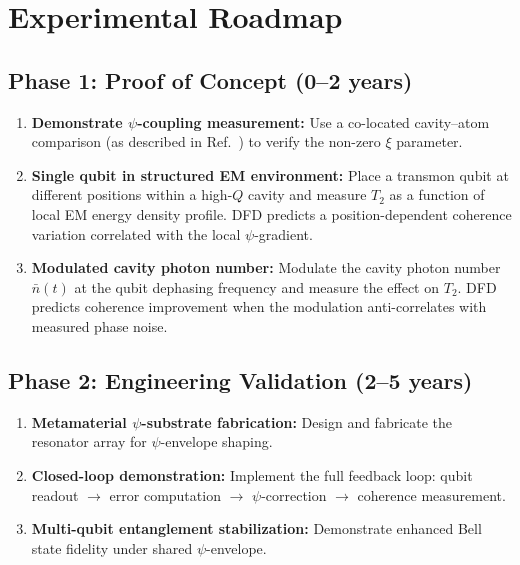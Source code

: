 \documentclass[aps,prd,twocolumn,superscriptaddress,nofootinbib]{revtex4-2}
\begin{document}
\section{Experimental Roadmap}\label{sec:roadmap}

\subsection{Phase 1: Proof of Concept (0--2 years)}

\begin{enumerate}
\item \textbf{Demonstrate $\psi$-coupling measurement:}
Use a co-located cavity--atom comparison (as described in
Ref.~\cite{Alcock2025Penrose}) to verify the non-zero $\xi$ parameter.
\item \textbf{Single qubit in structured EM environment:}
Place a transmon qubit at different positions within a high-$Q$ cavity
and measure $T_2$ as a function of local EM energy density profile. DFD
predicts a position-dependent coherence variation correlated with the
local $\psi$-gradient.
\item \textbf{Modulated cavity photon number:}
Modulate the cavity photon number $\bar{n}(t)$ at the qubit dephasing
frequency and measure the effect on $T_2$. DFD predicts coherence
improvement when the modulation anti-correlates with measured phase
noise.
\end{enumerate}

\subsection{Phase 2: Engineering Validation (2--5 years)}

\begin{enumerate}
\item \textbf{Metamaterial $\psi$-substrate fabrication:}
Design and fabricate the resonator array for $\psi$-envelope shaping.
\item \textbf{Closed-loop demonstration:}
Implement the full feedback loop: qubit readout $\to$ error computation
$\to$ $\psi$-correction $\to$ coherence measurement.
\item \textbf{Multi-qubit entanglement stabilization:}
Demonstrate enhanced Bell state fidelity under shared $\psi$-envelope.
\end{enumerate}
\end{document}
